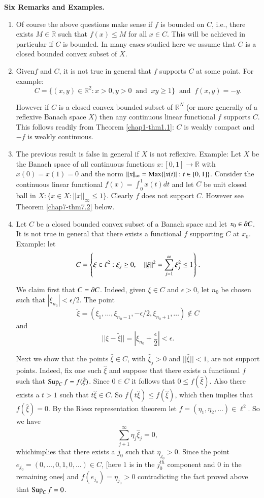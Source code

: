 \noindent
{\bf Six Remarks and Examples.}
\begin{enumerate}
\renewcommand{\labelenumi}{(\theenumi)}
\item Of course the above questions make sense if $f$ is bounded on
  $C$, i.e., there exists $M\in \mathbb{R}$ such that $f(x)\leq M$ for
  all $x\in C$. This will be achieved in particular if $C$ is
  bounded. In many cases studied here we assume that $C$ is a closed
  bounded convex subset of $X$. 

\item Given\pageoriginale $f$ and $C$, it is not true in general that
  $f$ supports $C$ at some point. For example:
$$
C=\{(x,y)\in \mathbb{R}^{2}:x>0, y>0\;\;\text{and}\;\; xy\geq
1\}\;\;\text{and}\;\; f(x,y)=-y.
$$

However if $C$ is a closed convex bounded subset of $\mathbb{R}^{N}$
(or more generally of a reflexive Banach space $X$) then any
continuous linear functional $f$ supports $C$. This follows readily
from Theorem \ref{chap1-thm1.1}: $C$ is weakly compact and $-f$ is
weakly continuous. 

\item The previous result is false in general if $X$ is not
  reflexive. Example: Let $X$ be the Banach space of all continuous
  functions $x:[0,1]\to \mathbb{R}$ with $x(0)=x(1)=0$ and the norm
  $||x||_{\infty}=\operatorname{Max}\{|x(t)|:t\in [0,1]\}$. Consider the continuous
  linear functional $f(x)=\int^{1}_{0}x(t)dt$ and let $C$ be unit
  closed ball in $X:\{x\in X:||x||_{\infty}\leq 1\}$. Clearly $f$ does
  not support $C$. However see Theorem \ref{chap7-thm7.2} below. 

\item Let $C$ be a closed bounded convex subset of a Banach space and
  let $x_{0}\in \partial C$. It is not true in general that there exists a
  functional $f$ supporting $C$ at $x_{0}$. Example: let
$$
C=\left\{\xi\in \ell^{2}:\xi_{j}\geq 0,\quad
||\xi||^{2}=\sum\limits^{\infty}_{j=1}\xi^{2}_{j}\leq 1\right\}.
$$

We claim first that $C=\partial C$. Indeed, given $\xi\in C$ and
$\epsilon>0$, let $n_{0}$ be chosen such that
$|\xi_{n_{0}}|<\epsilon/2$. The point
$$
\widetilde{\xi}=(\xi_{1},\ldots,\xi_{n_{0}-1},-\epsilon/2,\xi_{n_{0}+1},\ldots)\not\in C
$$
and
$$
||\xi-\widetilde{\xi}||=|\xi_{n_{0}}+\frac{\epsilon}{2}|<\epsilon. 
$$

Next we show that the points $\hat{\xi}\in C$, with
$\hat{\xi}_{j}>0$ and $||\hat{\xi}||<1$, are not support
points. Indeed, fix one such $\hat{\xi}$ and suppose that there
exists a functional $f$ such that $\operatorname{Sup}_{C}f=f(\hat{\xi})$. Since
$0\in C$ it follows that $0\leq f(\hat{\xi})$. Also there exists a
$t>1$ such that $t\hat{\xi}\in C$. So $f(t\hat{\xi})\leq
f(\hat{\xi})$, which then implies that $f(\hat{\xi})=0$. By
the Riesz representation theorem let $f=(\eta_{1},\eta_{2},\ldots)\in
\ell^{2}$. So we have
$$
\sum^{\infty}_{j+1}\eta_{j}\hat{\xi}_{j}=0,
$$
which\pageoriginale implies that there exists a $j_{0}$ such that
$\eta_{j_{0}}>0$. Since the point
$e_{j_{0}}=(0,\ldots,0,1,0,\ldots)\in C$, [here $1$ is in the
  $j^{th}_{0}$ component and $0$ in the remaining ones] and
$f(e_{j_{0}})=\eta_{j_{0}}>0$  contradicting the fact proved above
that $\operatorname{Sup}_{C}f=0$.


\end{enumerate}
